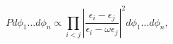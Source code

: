 \begin{equation}
Pd\phi_1 \dots d\phi_n\propto
\prod_{i<j}\left|\frac{\epsilon_i-\epsilon_j}
{\epsilon_i-\omega\epsilon_j}\right|^2 d\phi_1 \dots d\phi_n,
\label{distr1}
\end{equation}

